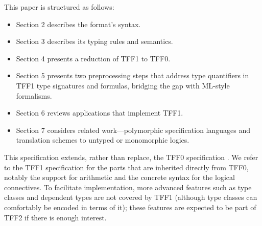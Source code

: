 This paper is structured as follows:
\begin{itemize}
\item Section 2 describes the format's syntax.
\item Section 3 describes its typing rules and semantics.
\item Section 4 presents a reduction of TFF1 to TFF0.
\item Section 5 presents two preprocessing steps that address type quantifiers
in TFF1 type signatures and formulas, bridging the gap with ML-style
formalisms. %
\item Section 6 reviews applications that implement TFF1.
\item Section 7 considers related work---polymorphic specification languages
and translation schemes to untyped or monomorphic logics.
\end{itemize}

This specification extends, rather than replace, the TFF0 specification
\cite{TFF0}. We refer to the TFF1 specification for the parts that are inherited
directly from TFF0, notably the support for arithmetic and the concrete syntax
for the logical connectives.
%
To facilitate implementation, more advanced features such as type classes and
dependent types are not covered by TFF1 (although type classes can comfortably
be encoded in terms of it); these features are expected to be part of TFF2 if
there is enough interest.
